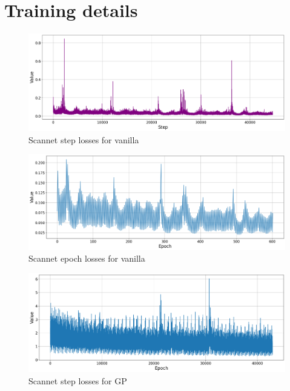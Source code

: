 
	\chapter{Training details}
	
	\begin{figure}
		\centering
		\includegraphics[width=13cm]{images/scannet_step_vanilla_all.png}
		\caption{Scannet step losses for vanilla}
		\label{fig:android_result}
	\end{figure}

	\begin{figure}
		\centering
		\includegraphics[width=13cm]{images/scannet_epoch_vanilla_all.png}
		\caption{Scannet epoch losses for vanilla}
		\label{fig:android_result}
	\end{figure}

	\begin{figure}
		\centering
		\includegraphics[width=13cm]{images/scannet_gp_step.png}
		\caption{Scannet step losses for GP}
		\label{fig:android_result}
	\end{figure}

